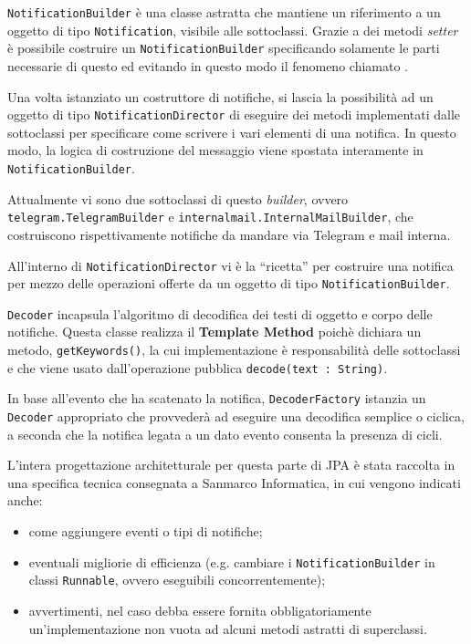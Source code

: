 \texttt{NotificationBuilder} è una classe astratta che mantiene un riferimento
a un oggetto di tipo \texttt{Notification}, visibile alle sottoclassi. Grazie
a dei metodi \emph{setter} è possibile costruire un
\texttt{NotificationBuilder} specificando solamente le parti necessarie di
questo ed evitando in questo modo il fenomeno chiamato .

Una volta istanziato un costruttore di notifiche, si lascia la possibilità ad
un oggetto di tipo \texttt{NotificationDirector} di eseguire dei metodi
implementati dalle sottoclassi per specificare come scrivere i vari elementi
di una notifica. In questo modo, la logica di costruzione del messaggio viene
spostata interamente in \texttt{NotificationBuilder}.

Attualmente vi sono due sottoclassi di questo \emph{builder}, ovvero
\texttt{telegram.TelegramBuilder} e \texttt{internalmail.InternalMailBuilder},
che costruiscono rispettivamente notifiche da mandare via Telegram e mail
interna.

All'interno di \texttt{NotificationDirector} vi è la ``ricetta'' per costruire
una notifica per mezzo delle operazioni offerte da un oggetto di tipo
\texttt{NotificationBuilder}.

\texttt{Decoder} incapsula l'algoritmo di decodifica dei testi di oggetto e
corpo delle notifiche. Questa classe realizza il 
\textbf{Template Method} poichè dichiara un metodo, \texttt{getKeywords()}, la
cui implementazione è responsabilità delle sottoclassi e che viene usato
dall'operazione pubblica \texttt{decode(text : String)}.

In base all'evento che ha scatenato la notifica, \texttt{DecoderFactory}
istanzia un \texttt{Decoder} appropriato che provvederà ad eseguire una
decodifica semplice o ciclica, a seconda che la notifica legata a un dato
evento consenta la presenza di cicli.

L'intera progettazione architetturale per questa parte di JPA è stata raccolta
in una specifica tecnica consegnata a Sanmarco Informatica, in cui vengono
indicati anche:

\begin{itemize}
\item come aggiungere eventi o tipi di notifiche;
\item eventuali migliorie di efficienza (e.g. cambiare i
  \texttt{NotificationBuilder} in classi \texttt{Runnable}, ovvero eseguibili
  concorrentemente);
\item avvertimenti, nel caso debba essere fornita obbligatoriamente
  un'implementazione non vuota ad alcuni metodi astratti di superclassi.
\end{itemize}

